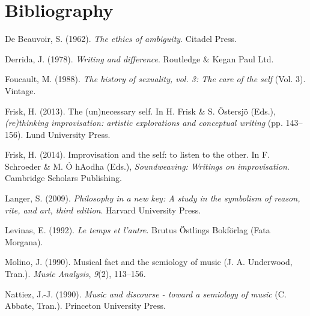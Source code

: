 \documentclass[11pt]{article}
\begin{document}
\section{Bibliography}
\label{sec:orgfab62cd}
\begin{hangparas}{1.5em}{1}
\hypertarget{citeproc_bib_item_1}{De Beauvoir, S. (1962). \textit{The ethics of ambiguity}. Citadel Press.}

\hypertarget{citeproc_bib_item_2}{Derrida, J. (1978). \textit{Writing and difference}. Routledge \& Kegan Paul Ltd.}

\hypertarget{citeproc_bib_item_3}{Foucault, M. (1988). \textit{The history of sexuality, vol. 3: The care of the self} (Vol. 3). Vintage.}

\hypertarget{citeproc_bib_item_4}{Frisk, H. (2013). The (un)necessary self. In H. Frisk \& S. Östersjö (Eds.), \textit{(re)thinking improvisation: artistic explorations and conceptual writing} (pp. 143–156). Lund University Press.}

\hypertarget{citeproc_bib_item_5}{Frisk, H. (2014). Improvisation and the self: to listen to the other. In F. Schroeder \& M. Ó hAodha (Eds.), \textit{Soundweaving: Writings on improvisation}. Cambridge Scholars Publishing.}

\hypertarget{citeproc_bib_item_6}{Langer, S. (2009). \textit{Philosophy in a new key: A study in the symbolism of reason, rite, and art, third edition}. Harvard University Press.}

\hypertarget{citeproc_bib_item_7}{Levinas, E. (1992). \textit{Le temps et l’autre}. Brutus Östlings Bokförlag (Fata Morgana).}

\hypertarget{citeproc_bib_item_8}{Molino, J. (1990). Musical fact and the semiology of music (J. A. Underwood, Tran.). \textit{Music Analysis}, \textit{9}(2), 113–156.}

\hypertarget{citeproc_bib_item_9}{Nattiez, J.-J. (1990). \textit{Music and discourse - toward a semiology of music} (C. Abbate, Tran.). Princeton University Press.}\bigskip
\end{hangparas}
\end{document}
